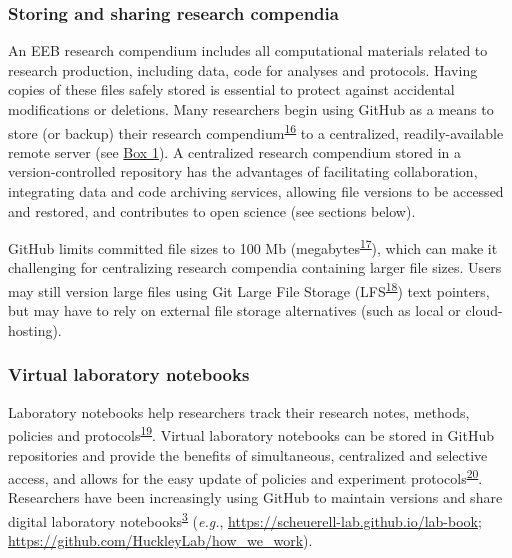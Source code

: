 \hypertarget{storing-and-sharing-research-compendia}{%
\subsubsection{Storing and sharing research compendia}\label{storing-and-sharing-research-compendia}}

An EEB research compendium includes all computational materials related to research production, including data, code for analyses and protocols.
Having copies of these files safely stored is essential to protect against accidental modifications or deletions.
Many researchers begin using GitHub as a means to store (or backup) their research compendium\textsuperscript{\protect\hyperlink{ref-MwwMapRG}{16}} to a centralized, readily-available remote server (see \protect\hyperlink{definitions}{Box 1}).
A centralized research compendium stored in a version-controlled repository has the advantages of facilitating collaboration, integrating data and code archiving services, allowing file versions to be accessed and restored, and contributes to open science (see sections below).

GitHub limits committed file sizes to 100 Mb (megabytes\textsuperscript{\protect\hyperlink{ref-1Co6ZZjF1}{17}}), which can make it challenging for centralizing research compendia containing larger file sizes.
Users may still version large files using Git Large File Storage (LFS\textsuperscript{\protect\hyperlink{ref-11GtZ7icJ}{18}}) text pointers, but may have to rely on external file storage alternatives (such as local or cloud-hosting).

\hypertarget{virtual-laboratory-notebooks}{%
\subsubsection{Virtual laboratory notebooks}\label{virtual-laboratory-notebooks}}

Laboratory notebooks help researchers track their research notes, methods, policies and protocols\textsuperscript{\protect\hyperlink{ref-wwHxTOtm}{19}}.
Virtual laboratory notebooks can be stored in GitHub repositories and provide the benefits of simultaneous, centralized and selective access, and allows for the easy update of policies and experiment protocols\textsuperscript{\protect\hyperlink{ref-10V7x4H4l}{20}}.
Researchers have been increasingly using GitHub to maintain versions and share digital laboratory notebooks\textsuperscript{\protect\hyperlink{ref-10ghgV3S8}{3}} (\emph{e.g.}, \url{https://scheuerell-lab.github.io/lab-book}; \url{https://github.com/HuckleyLab/how_we_work}).

